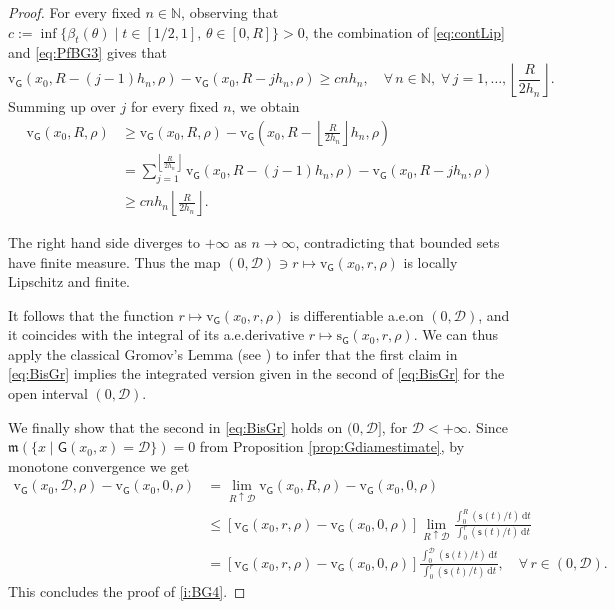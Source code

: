 \documentclass[11pt,a4paper]{article}
\theoremstyle{plain}
\theoremstyle{definition}
\theoremstyle{remark}
\numberwithin{equation}{section}
\newcommand{\N}{\mathbb{N}} %
\newcommand{\cD}{\mathcal{D}}
\newcommand{\sfs}{\mathsf{s}}
\newcommand{\rv}{\mathrm{v}}
\newcommand{\rs}{\mathrm{s}}
\newcommand{\di}{\mathrm{d}}
\newcommand{\mm}{\mathfrak m}
\newcommand{\sfG}{\mathsf G}
\begin{document}
\begin{proof}
For every fixed $n\in \N$, observing that $c:=\inf\{\beta_{t}(\theta) \mid t\in [1/2, 1],\, \theta\in [0,R]\}>0$, the combination of \eqref{eq:contLip} and \eqref{eq:PfBG3}  gives that
\begin{equation}
\rv_{\sfG}(x_{0}, R- (j-1) h_{n},\rho)- \rv_{\sfG}(x_{0}, R- j h_{n},\rho)\geq c  n h_{n}, \quad \forall\, n\in \N, \;\forall \,  j=1,\ldots, \left\lfloor \frac{R}{2 h_{n}} \right \rfloor.
\end{equation}
Summing up over $j$ for every fixed $n$, we obtain
\begin{align*}
\rv_{\sfG}(x_{0}, R,\rho) &\geq \rv_{\sfG}(x_{0}, R,\rho) - \rv_{\sfG}\left(x_{0}, R- \left\lfloor \frac{R}{2 h_{n}}  \right \rfloor h_{n},\rho\right)\\
&= \sum_{j=1}^{ \left\lfloor \frac{R}{2 h_{n}}  \right \rfloor} \rv_{\sfG}(x_{0}, R-(j-1) h_{n},\rho)-  \rv_{\sfG}(x_{0}, R- j h_{n},\rho) \\
&\geq c n h_{n} \left\lfloor \frac{R}{2 h_{n}}  \right \rfloor.
\end{align*}

The right hand side diverges to $+\infty$ as $n\to \infty$, contradicting that  bounded sets have finite measure. Thus the map $(0,\cD)\ni r\mapsto \rv_{\sfG}(x_{0}, r,\rho)$ is locally Lipschitz and finite.

It follows that the function  $r\mapsto \rv_{\sfG}(x_{0}, r,\rho)$ is differentiable a.e.\@ on $(0,\cD)$, and it coincides with the integral of its a.e.\@ derivative $r\mapsto \rs_{\sfG}(x_{0}, r,\rho)$. We can thus apply the classical Gromov's Lemma (see \cite[Lemma III.4.1]{Chav06})  to infer that the first claim in \eqref{eq:BisGr} implies the integrated version given in the second of \eqref{eq:BisGr} for the open interval $(0,\cD)$.

We finally show that the second in \eqref{eq:BisGr} holds on $(0,\cD]$, for $\cD<+\infty$. Since $\mm(\{ x\mid \sfG(x_{0}, x) =\cD \}) =0$ from Proposition \ref{prop:Gdiamestimate}, by monotone convergence we get
\begin{align*}
\rv_{\sfG}(x_{0}, \cD,\rho) - \rv_{\sfG}(x_{0}, 0,\rho)&=\lim_{R\uparrow \cD} \rv_{\sfG}(x_{0}, R,\rho) - \rv_{\sfG}(x_{0}, 0,\rho)  \\
&\leq \left[\rv_{\sfG}(x_{0}, r,\rho) -\rv_{\sfG}(x_{0}, 0,\rho)\right] \lim_{R\uparrow \cD} \frac{\int_{0}^{R} (\sfs(t)/t) \, \di t  }{\int_{0}^{r} (\sfs(t)/t) \, \di t }  \\
&  =\left[\rv_{\sfG}(x_{0}, r,\rho) -\rv_{\sfG}(x_{0}, 0,\rho)\right]   \frac{\int_{0}^{\cD} (\sfs(t)/t) \, \di t  }{\int_{0}^{r} (\sfs(t)/t) \, \di t }, \quad \forall\, r\in (0,\cD).
\end{align*}
This concludes the proof of \ref{i:BG4}.


\end{proof}
\end{document}
